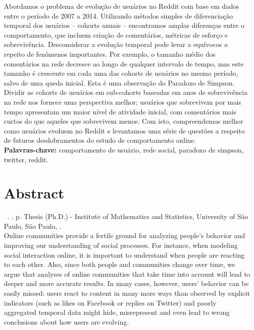 \documentclass[11pt,twoside,a4paper]{book}
\begin{document}
Abordamos o problema de evolução de usuários no Reddit com base em dados entre o período de 2007 a 2014. Utilizando métodos simples de diferenciação temporal dos usuários -- cohorts anuais -- encontramos amplas diferenças entre o comportamento, que incluem criação de comentários, métricas de esforço e sobrevivência. Desconsiderar a evolução temporal pode levar a equívocos a repeito de fenômenos importantes. Por exemplo, o tamanho médio dos comentários na rede decresce ao longo de qualquer intervalo de tempo, mas este tamanho é crescente em cada uma das cohorts de usuários no mesmo período, salvo de uma queda inicial. Esta é uma observação do Paradoxo de Simpson. Dividir as cohorts de usuários em sub-cohorts baseadas em anos de sobrevivência na rede nos fornece uma perspectiva melhor; usuários que sobrevivem por mais tempo apresentam um maior nível de atividade inicial, com comentários mais curtos do que aqueles que sobrevivem menos. Com isto, compreendemos melhor como usuários evoluem no Reddit e levantamos uma série de questões a respeito de futuros desdobramentos do estudo de comportamento online.
\\

\noindent \textbf{Palavras-chave:} comportamento de usuário, rede social, paradoxo de simpson, twitter, reddit.

\chapter*{Abstract}
\noindent \surnameAbbr~\textbf{\phdTitle}.
\thesisYear. \thesisPages p. Thesis (Ph.D.) - Institute of Mathematics and Statistics,
University of São Paulo, São Paulo, \thesisYear.
\\


Online communities provide a fertile ground for analyzing people's behavior and improving our understanding of social processes. For instance, when modeling social interaction online, it is important to understand when people are reacting to each other. Also, since both people and communities change over time, we argue that analyses of online communities that take time into account will lead to deeper and more accurate results. In many cases, however, users’ behavior can be easily missed: users react to content in many more ways than observed by explicit indicators (such as likes on Facebook or replies on Twitter) and poorly aggregated temporal data might hide, misrepresent and even lead to wrong conclusions about how users are evolving. 
\end{document}
